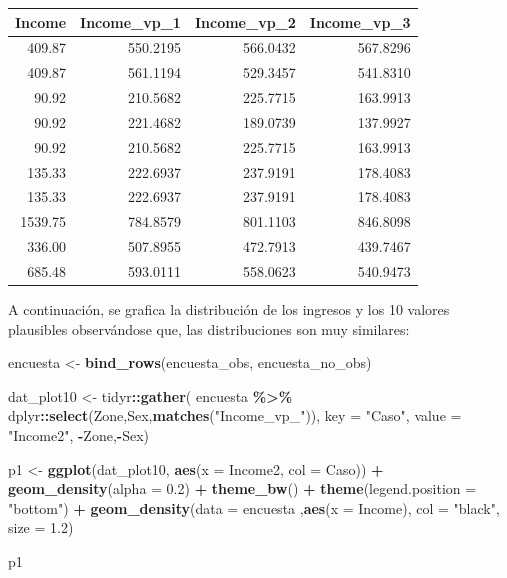 \documentclass[
  spanish,
  12pt,
]{book}
\newenvironment{Shaded}{\begin{snugshade}}{\end{snugshade}}
\newcommand{\AttributeTok}[1]{\textcolor[rgb]{0.13,0.29,0.53}{#1}}
\newcommand{\FloatTok}[1]{\textcolor[rgb]{0.00,0.00,0.81}{#1}}
\newcommand{\FunctionTok}[1]{\textcolor[rgb]{0.13,0.29,0.53}{\textbf{#1}}}
\newcommand{\NormalTok}[1]{#1}
\newcommand{\OtherTok}[1]{\textcolor[rgb]{0.56,0.35,0.01}{#1}}
\newcommand{\SpecialCharTok}[1]{\textcolor[rgb]{0.81,0.36,0.00}{\textbf{#1}}}
\newcommand{\StringTok}[1]{\textcolor[rgb]{0.31,0.60,0.02}{#1}}
\begin{document}
\begin{tabular}{r|r|r|r}
\hline
Income & Income\_vp\_1 & Income\_vp\_2 & Income\_vp\_3\\
\hline
409.87 & 550.2195 & 566.0432 & 567.8296\\
\hline
409.87 & 561.1194 & 529.3457 & 541.8310\\
\hline
90.92 & 210.5682 & 225.7715 & 163.9913\\
\hline
90.92 & 221.4682 & 189.0739 & 137.9927\\
\hline
90.92 & 210.5682 & 225.7715 & 163.9913\\
\hline
135.33 & 222.6937 & 237.9191 & 178.4083\\
\hline
135.33 & 222.6937 & 237.9191 & 178.4083\\
\hline
1539.75 & 784.8579 & 801.1103 & 846.8098\\
\hline
336.00 & 507.8955 & 472.7913 & 439.7467\\
\hline
685.48 & 593.0111 & 558.0623 & 540.9473\\
\hline
\end{tabular}

A continuación, se grafica la distribución de los ingresos y los 10 valores plausibles observándose que, las distribuciones son muy similares:

\begin{Shaded}
\begin{Highlighting}[]
\NormalTok{encuesta }\OtherTok{\textless{}{-}} \FunctionTok{bind\_rows}\NormalTok{(encuesta\_obs, encuesta\_no\_obs)}

\NormalTok{dat\_plot10 }\OtherTok{\textless{}{-}}\NormalTok{ tidyr}\SpecialCharTok{::}\FunctionTok{gather}\NormalTok{(}
\NormalTok{  encuesta }\SpecialCharTok{\%\textgreater{}\%}\NormalTok{ dplyr}\SpecialCharTok{::}\FunctionTok{select}\NormalTok{(Zone,Sex,}\FunctionTok{matches}\NormalTok{(}\StringTok{"Income\_vp\_"}\NormalTok{)),}
  \AttributeTok{key =} \StringTok{"Caso"}\NormalTok{, }\AttributeTok{value =} \StringTok{"Income2"}\NormalTok{, }\SpecialCharTok{{-}}\NormalTok{Zone,}\SpecialCharTok{{-}}\NormalTok{Sex)}

\NormalTok{p1 }\OtherTok{\textless{}{-}} \FunctionTok{ggplot}\NormalTok{(dat\_plot10, }\FunctionTok{aes}\NormalTok{(}\AttributeTok{x =}\NormalTok{ Income2, }\AttributeTok{col =}\NormalTok{ Caso)) }\SpecialCharTok{+} 
  \FunctionTok{geom\_density}\NormalTok{(}\AttributeTok{alpha =} \FloatTok{0.2}\NormalTok{) }\SpecialCharTok{+} \FunctionTok{theme\_bw}\NormalTok{() }\SpecialCharTok{+}
   \FunctionTok{theme}\NormalTok{(}\AttributeTok{legend.position =} \StringTok{"bottom"}\NormalTok{) }\SpecialCharTok{+} \FunctionTok{geom\_density}\NormalTok{(}\AttributeTok{data =}\NormalTok{ encuesta ,}\FunctionTok{aes}\NormalTok{(}\AttributeTok{x =}\NormalTok{ Income), }\AttributeTok{col =}  \StringTok{"black"}\NormalTok{, }\AttributeTok{size =} \FloatTok{1.2}\NormalTok{) }

\NormalTok{p1}
\end{Highlighting}
\end{Shaded}
\end{document}
